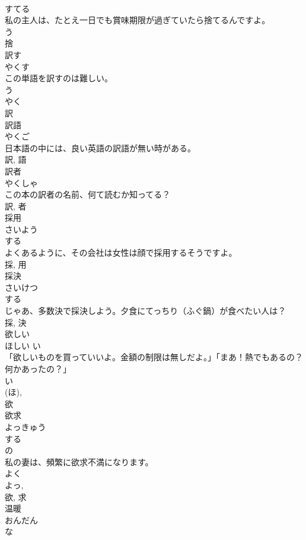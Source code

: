 \documentclass[8pt]{extreport}
\begin{document}
\begin{CJK}{UTF8}{min}
\\	すてる	
\\	私の主人は、たとえ一日でも賞味期限が過ぎていたら捨てるんですよ。	
\\	う 
\\	捨	
\\	訳す	
\\	やくす	
\\	この単語を訳すのは難しい。	
\\	う 
\\	やく 
\\	訳	
\\	訳語	
\\	やくご	
\\	日本語の中には、良い英語の訳語が無い時がある。	
\\	訳, 語	
\\	訳者	
\\	やくしゃ	
\\	この本の訳者の名前、何て読むか知ってる？	
\\	訳, 者	
\\	採用	
\\	さいよう	
\\	する 
\\	よくあるように、その会社は女性は顔で採用するそうですよ。	
\\	採, 用	
\\	採決	
\\	さいけつ	
\\	する 
\\	じゃあ、多数決で採決しよう。夕食にてっちり（ふぐ鍋）が食べたい人は？	
\\	採, 決	
\\	欲しい	
\\	ほしい	い 
\\	「欲しいものを買っていいよ。金額の制限は無しだよ。」「まあ！熱でもあるの？ 何かあったの？」	
\\	い 
\\	(ほ), 
\\	欲	
\\	欲求	
\\	よっきゅう	
\\	する 
\\	の 
\\	私の妻は、頻繁に欲求不満になります。	
\\	よく 
\\	よっ, 
\\	欲, 求	
\\	温暖	
\\	おんだん	
\\	な 

\end{CJK}
\end{document}
